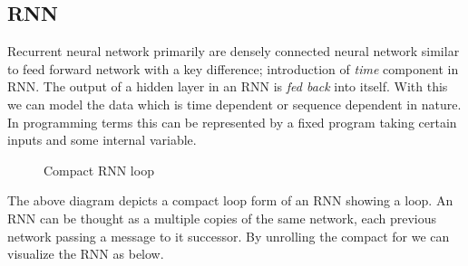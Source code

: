 \subsection{RNN}
Recurrent neural network primarily are densely connected neural network similar to feed forward network with a key difference; introduction of \textit{time} component in RNN. The output of a hidden layer in an RNN is \textit{fed back } into itself. With this we can model the data which is time dependent or sequence dependent in nature. In programming terms this can be represented by a fixed program taking certain inputs and some internal variable.

\begin{figure}[H]
\begin{center}
\caption{Compact RNN loop}
\end{center}
\end{figure}

\newpara The above diagram depicts a compact loop form of an RNN showing a loop. An RNN can be thought as a multiple copies of the same network, each previous network passing a message to it successor. By unrolling the compact for we can visualize the RNN as below. 

